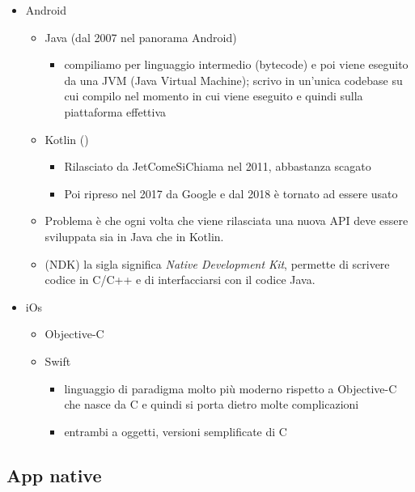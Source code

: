 \begin{itemize}
    \item Android
    \begin{itemize}
        \item Java (dal 2007 nel panorama Android)
        \begin{itemize}
            \item compiliamo per linguaggio intermedio (bytecode) e poi viene eseguito da una JVM (Java Virtual Machine); scrivo in un'unica codebase su cui compilo nel momento in cui viene eseguito e quindi sulla piattaforma effettiva
        \end{itemize}
        \item Kotlin ()
        \begin{itemize}
            \item Rilasciato da JetComeSiChiama nel 2011, abbastanza scagato
            \item Poi ripreso nel 2017 da Google e dal 2018 è tornato ad essere usato
        \end{itemize}
        \item Problema è che ogni volta che viene rilasciata una nuova API deve essere sviluppata sia in Java che in Kotlin.
        \item (NDK) la sigla significa \textit{Native Development Kit}, permette di scrivere codice in C/C++ e di interfacciarsi con il codice Java.
    \end{itemize}
    \item iOs
    \begin{itemize}
        \item Objective-C 
        \item Swift
        \begin{itemize}
            \item linguaggio di paradigma molto più moderno rispetto a Objective-C che nasce da C e quindi si porta dietro molte complicazioni
            \item entrambi a oggetti, versioni semplificate di C
        \end{itemize}
    \end{itemize}
\end{itemize}

\subsection{App native}
